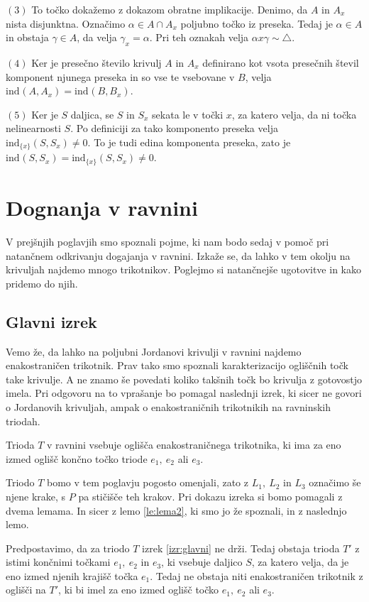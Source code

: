 \documentclass[mat1]{fmfdelo}
\newcommand{\ind}[3][]{\text{ind}_{#1}(#2, #3)}
\begin{document}
$(3)$ To točko dokažemo z dokazom obratne implikacije. Denimo, da $A$ in $A_x$ nista disjunktna. Označimo $\alpha \in A \cap A_x$ poljubno točko iz preseka. Tedaj je $\alpha \in A$ in obstaja $\gamma \in A$, da velja $\gamma_x = \alpha$. Pri teh oznakah velja $\alpha x \gamma \sim \triangle$.

$(4)$ Ker je presečno število krivulj $A$ in $A_x$ definirano kot vsota presečnih števil komponent njunega preseka in so vse te vsebovane v $B$, velja $\ind{A}{A_x} = \ind{B}{B_x}$.

$(5)$ Ker je $S$ daljica, se $S$ in $S_x$ sekata le v točki $x$, za katero velja, da ni točka nelinearnosti $S$. Po definiciji za tako komponento preseka velja $\ind[\{x\}]{S}{S_x} \neq 0$. To je tudi edina komponenta preseka, zato je $\ind{S}{S_x} = \ind[\{x\}]{S}{S_x} \neq 0$.
\endproof


\section{Dognanja v ravnini}
V prejšnjih poglavjih smo spoznali pojme, ki nam bodo sedaj v pomoč pri natančnem odkrivanju dogajanja v ravnini. Izkaže se, da lahko v tem okolju na krivuljah najdemo mnogo trikotnikov. Poglejmo si natančnejše ugotovitve in kako pridemo do njih.
\subsection{Glavni izrek} 
Vemo že, da lahko na poljubni Jordanovi krivulji v ravnini najdemo enakostraničen trikotnik. Prav tako smo spoznali karakterizacijo ogliščnih točk take krivulje. A ne znamo še povedati koliko takšnih točk bo krivulja z gotovostjo imela. Pri odgovoru na to vprašanje bo pomagal naslednji izrek, ki sicer ne govori o Jordanovih krivuljah, ampak o enakostraničnih trikotnikih na ravninskih triodah.
\begin{izrek}\label{izr:glavni}
Trioda $T$  v ravnini vsebuje oglišča enakostraničnega trikotnika, ki ima za eno izmed oglišč končno točko triode $e_1,\ e_2$ ali $e_3$.
\end{izrek}
Triodo $T$ bomo v tem poglavju pogosto omenjali, zato z $L_1,\ L_2$ in $L_3$ označimo še njene krake, s $P$ pa stičišče teh krakov. Pri dokazu izreka si bomo pomagali z dvema lemama. In sicer z lemo \ref{le:lema2}, ki smo jo že spoznali, in z naslednjo lemo.
\begin{lema}\label{le:protislovje}
Predpostavimo, da za triodo $T$ izrek \ref{izr:glavni} ne drži. Tedaj obstaja trioda $T'$ z istimi končnimi točkami $e_1,\ e_2$ in $e_3$, ki vsebuje daljico $S$, za katero velja, da je eno izmed njenih krajišč točka $e_1$. Tedaj ne obstaja niti enakostraničen trikotnik z oglišči na $T'$, ki bi imel za eno izmed oglišč točko $e_1,\ e_2$ ali $e_3$.
\end{lema}
\end{document}
